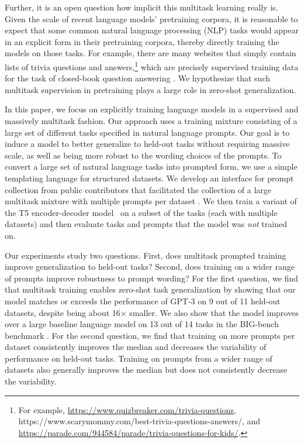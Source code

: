 Further, it is an open question how implicit this multitask learning really is. Given the scale of recent language models' pretraining corpora, it is reasonable to expect that some common natural language processing (NLP) tasks would appear in an explicit form in their pretraining corpora, thereby directly training the models on those tasks. For example, there are many websites that simply contain lists of trivia questions and answers,\footnote{For example,  \url{https://www.quizbreaker.com/trivia-questions}, https://www.scarymommy.com/best-trivia-questions-answers/, and \url{https://parade.com/944584/parade/trivia-questions-for-kids/}.} which are precisely supervised training data for the task of closed-book question answering \citep{roberts-etal-2020-much}. We hypothesize that such multitask supervision in pretraining plays a large role in zero-shot generalization.  

In this paper, we focus on explicitly training language models in a supervised and massively multitask fashion. Our approach uses a training mixture consisting of a large set of different tasks specified in natural language prompts. Our goal is to induce a model to better generalize to held-out tasks without requiring massive scale, as well as being more robust to the wording choices of the prompts. To convert a large set of natural language tasks into prompted form, we use a simple templating language for structured datasets. We develop an interface for prompt collection from public contributors that facilitated the collection of a large multitask mixture with multiple prompts per dataset \citep{promptsource}. We then train a variant of the T5 encoder-decoder model~\citep{t5,lester_prompt} on a subset of the tasks (each with multiple datasets) and then evaluate tasks and prompts that the model was \textit{not} trained on. 

Our experiments study two questions. First, does multitask prompted training improve generalization to held-out tasks? Second, does training on a wider range of prompts improve robustness to prompt wording? For the first question, we find that multitask training enables zero-shot task generalization by showing that our model matches or exceeds the performance of GPT-3 \citep{gpt3} on 9 out of 11 held-out datasets, despite being about 16$\times$ smaller. We also show that the model improves over a large baseline language model on 13 out of 14 tasks in the BIG-bench benchmark \citep{bigbench}. For the second question, we find that training on more prompts per dataset consistently improves the median and decreases the variability of performance on held-out tasks. Training on prompts from a wider range of datasets also generally improves the median but does not consistently decrease the variability.

